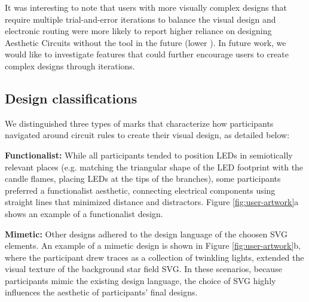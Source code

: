 \documentclass{sigchi}
\begin{document}
It was interesting to note that users with more visually complex designs that require multiple trial-and-error iterations to balance the visual design and electronic routing were more likely to report higher reliance on designing Aesthetic Circuits without the tool in the future (lower ). In future work, we would like to investigate features that could further encourage users to create complex designs through iterations.
  
 \subsection{Design classifications}

 We distinguished three types of marks that characterize how participants navigated around circuit rules to create their visual design, as detailed below:
  


  \textbf{Functionalist:} While all participants tended to position LEDs in semiotically relevant places (e.g. matching the triangular shape of the LED footprint with the candle flames, placing LEDs at the tips of the branches), some participants preferred a functionalist aesthetic, connecting electrical components using straight lines that minimized distance and distractors. Figure \ref{fig:user-artwork}a shows an example of a functionalist design. 

  \textbf{Mimetic:}
  Other designs adhered to the design language of the choosen SVG elements. An example of a mimetic design is shown in Figure \ref{fig:user-artwork}b, where the participant drew traces as a collection of twinkling lights, extended the visual texture of the background star field SVG.  In these scenarios, because participants mimic the existing design language, the choice of SVG highly influences the aesthetic of participants' final designs.
  
\end{document}
